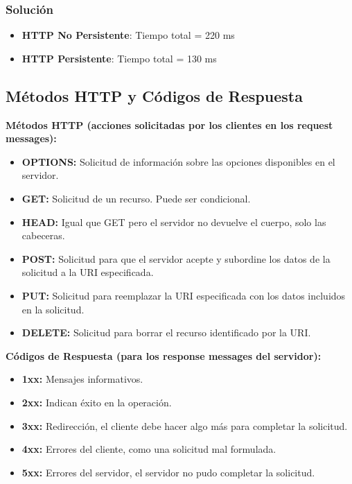\documentclass[a4paper,12pt]{article}
\begin{document}
\subsubsection{Solución}
\begin{itemize}
    \item \textbf{HTTP No Persistente}: Tiempo total = 220 ms
    \item \textbf{HTTP Persistente}: Tiempo total = 130 ms
\end{itemize}

\subsection{Métodos HTTP y Códigos de Respuesta}

\textbf{Métodos HTTP (acciones solicitadas por los clientes en los request messages):}
\begin{itemize}
    \item \textbf{OPTIONS:} Solicitud de información sobre las opciones disponibles en el servidor.
    \item \textbf{GET:} Solicitud de un recurso. Puede ser condicional.
    \item \textbf{HEAD:} Igual que GET pero el servidor no devuelve el cuerpo, solo las cabeceras.
    \item \textbf{POST:} Solicitud para que el servidor acepte y subordine los datos de la solicitud a la URI especificada.
    \item \textbf{PUT:} Solicitud para reemplazar la URI especificada con los datos incluidos en la solicitud.
    \item \textbf{DELETE:} Solicitud para borrar el recurso identificado por la URI.
\end{itemize}

\textbf{Códigos de Respuesta (para los response messages del servidor):}
\begin{itemize}
    \item \textbf{1xx:} Mensajes informativos.
    \item \textbf{2xx:} Indican éxito en la operación.
    \item \textbf{3xx:} Redirección, el cliente debe hacer algo más para completar la solicitud.
    \item \textbf{4xx:} Errores del cliente, como una solicitud mal formulada.
    \item \textbf{5xx:} Errores del servidor, el servidor no pudo completar la solicitud.
\end{itemize}
\end{document}
